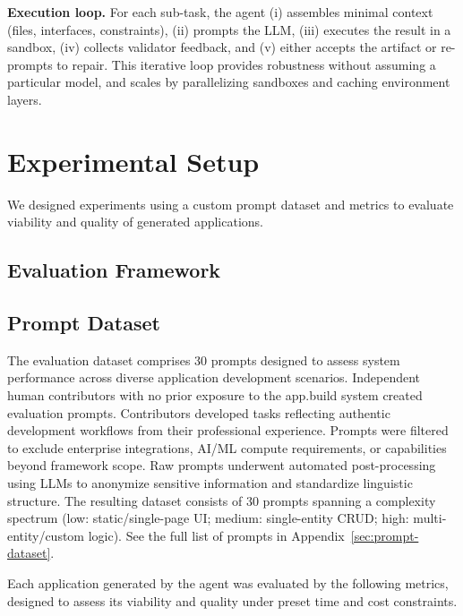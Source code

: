 \documentclass[conference]{IEEEtran}
\begin{document}
\textbf{Execution loop.} For each sub-task, the agent (i) assembles minimal context (files, interfaces, constraints), (ii) prompts the LLM, (iii) executes the result in a sandbox, (iv) collects validator feedback, and (v) either accepts the artifact or re-prompts to repair. This iterative loop provides robustness without assuming a particular model, and scales by parallelizing sandboxes and caching environment layers.

\section{Experimental Setup}
\label{sec:experimental-setup}

We designed experiments using a custom prompt dataset and metrics to evaluate viability and quality of generated applications.

\subsection{Evaluation Framework}

\subsection{Prompt Dataset}
\label{sec:prompt-dataset-desc}

The evaluation dataset comprises 30 prompts designed to assess system performance across diverse application development scenarios. Independent human contributors with no prior exposure to the app.build system created evaluation prompts. Contributors developed tasks reflecting authentic development workflows from their professional experience. Prompts were filtered to exclude enterprise integrations, AI/ML compute requirements, or capabilities beyond framework scope. Raw prompts underwent automated post-processing using LLMs to anonymize sensitive information and standardize linguistic structure.
The resulting dataset consists of 30 prompts spanning a complexity spectrum (low: static/single-page UI; medium: single-entity CRUD; high: multi-entity/custom logic).
See the full list of prompts in Appendix~\ref{sec:prompt-dataset}.

Each application generated by the agent was evaluated by the following metrics, designed to assess its viability and quality under preset time and cost constraints.
\end{document}
